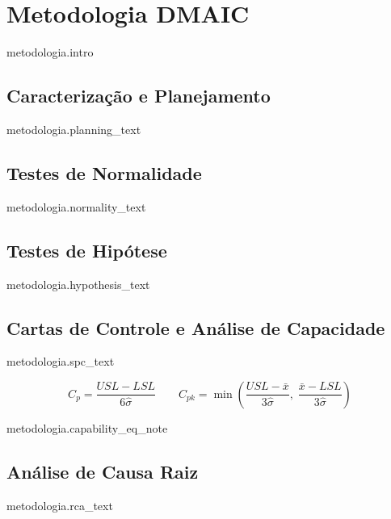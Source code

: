 \section{Metodologia DMAIC}

{{ metodologia.intro }}


\subsection{Caracteriza\c{c}\~{a}o e Planejamento}

{{ metodologia.planning_text }}

\subsection{Testes de Normalidade}

{{ metodologia.normality_text }}

\subsection{Testes de Hip\'otese}

{{ metodologia.hypothesis_text }}

\subsection{Cartas de Controle e An\'alise de Capacidade}

{{ metodologia.spc_text }}

\begin{equation}
    C_p = \frac{USL - LSL}{6\hat{\sigma}}
    \qquad
    C_{pk} = \min\!\left(\frac{USL - \bar{x}}{3\hat{\sigma}},\;
                          \frac{\bar{x} - LSL}{3\hat{\sigma}}\right)
\end{equation}

{{ metodologia.capability_eq_note }}

\subsection{An\'alise de Causa Raiz}

{{ metodologia.rca_text }}
